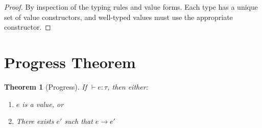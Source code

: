 \documentclass[11pt,twoside,openright]{book}
\theoremstyle{definition}
\theoremstyle{plain}
\newtheorem{theorem}[definition]{Theorem}
\theoremstyle{remark}
\newcommand{\smallstep}{\to}
\begin{document}
\begin{proof}
By inspection of the typing rules and value forms. Each type has a unique set of value constructors, and well-typed values must use the appropriate constructor.
\end{proof}

\section{Progress Theorem}

\begin{theorem}[Progress]
\label{thm:progress}
If $\vdash e : \tau$, then either:
\begin{enumerate}
  \item $e$ is a value, or
  \item There exists $e'$ such that $e \smallstep e'$
\end{enumerate}
\end{theorem}
\end{document}
